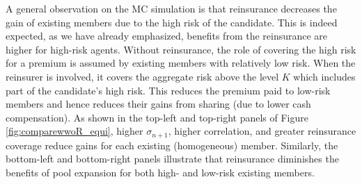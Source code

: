 \documentclass[fleqn,mnsc,nonblindrev]{informs4}
\begin{document}
A general observation on the MC simulation is that reinsurance decreases the gain of existing members due to the high risk of the candidate. This is indeed expected, as we have already emphasized, benefits from the reinsurance are higher for high-risk agents. Without reinsurance, the role of covering the high risk for a premium is assumed by existing members with relatively low risk. When the reinsurer is involved, it covers the aggregate risk above the level $K$ which includes part of the candidate's high risk. This reduces the premium paid to low-risk members and hence reduces their gains from sharing (due to lower cash compensation).   {As shown in the top-left and top-right panels of Figure \ref{fig:comparewwoR_equi}}, higher $\sigma_{n+1}$, higher correlation, and   {greater} reinsurance coverage   {reduce} gains for each   {existing (homogeneous)} member.   {Similarly, the bottom-left and bottom-right panels illustrate} that reinsurance   {diminishes} the benefits   {of pool} expansion for both high- and low-risk existing members.

\end{document}
